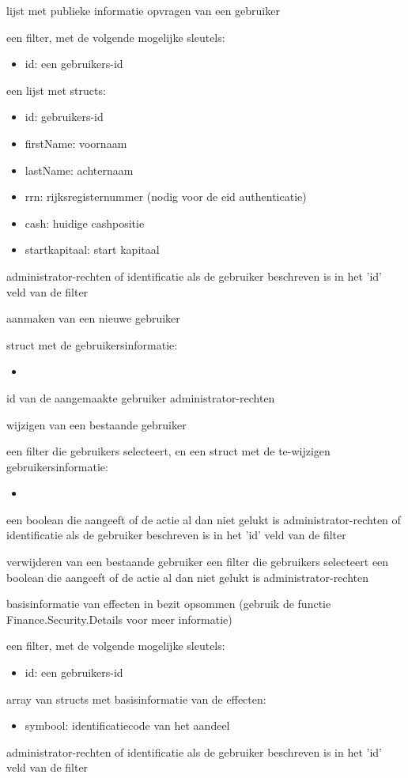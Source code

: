 	{ lijst met publieke informatie opvragen van een gebruiker }
	{ een filter, met de volgende mogelijke sleutels:
		\begin{itemize}
		\item{id: een gebruikers-id}
		\end{itemize} }
	{ een lijst met structs:
		\begin{itemize}
		\item{id: gebruikers-id}
		\item{firstName: voornaam}
		\item{lastName: achternaam}
		\item{rrn: rijksregisternummer (nodig voor de eid authenticatie)}
		\item{cash: huidige cashpositie}
		\item{startkapitaal: start kapitaal}
		\end{itemize} }
	{ administrator-rechten of identificatie als de gebruiker beschreven is in het 'id' veld van de filter }

	{ aanmaken van een nieuwe gebruiker }
	{ struct met de gebruikersinformatie:
		\begin{itemize}
		\item{}
		\end{itemize} }
	{ id van de aangemaakte gebruiker }
	{ administrator-rechten }

	{ wijzigen van een bestaande gebruiker }
	{ een filter die gebruikers selecteert, en een struct met de te-wijzigen gebruikersinformatie:
		\begin{itemize}
		\item{}
		\end{itemize} }
	{ een boolean die aangeeft of de actie al dan niet gelukt is }
	{ administrator-rechten of identificatie als de gebruiker beschreven is in het 'id' veld van de filter }

	{ verwijderen van een bestaande gebruiker }
	{ een filter die gebruikers selecteert }
	{ een boolean die aangeeft of de actie al dan niet gelukt is }
	{ administrator-rechten }

	{ basisinformatie van effecten in bezit opsommen (gebruik de functie Finance.Security.Details voor meer informatie) }
	{ een filter, met de volgende mogelijke sleutels:
		\begin{itemize}
		\item{id: een gebruikers-id}
		\end{itemize} }
	{ array van structs met basisinformatie van de effecten:
		\begin{itemize}
		\item{symbool: identificatiecode van het aandeel}
		\end{itemize} }
	{ administrator-rechten of identificatie als de gebruiker beschreven is in het 'id' veld van de filter }

